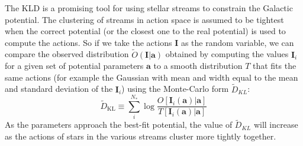 \documentclass[useAMS,usenatbib,a4paper,referee]{mn2e}
\newcommand{\sub}[2]{\ensuremath{#1_{\mathrm{#2}}}}
\begin{document}
The KLD is a promising tool for using stellar streams to constrain the Galactic potential. The clustering of streams in action space is assumed to be tightest when the correct potential (or the closest one to the real potential) is used to compute the actions. So if we take the actions $\mathbf{I}$ as the random variable, we can compare the observed distribution $\tilde{O}(\mathbf{I}|\mathbf{a})$ obtained by computing the values $\mathbf{I}_i$ for a given set of potential parameters $\mathbf{a}$ to a smooth distribution $T$ that fits the same actions (for example the Gaussian with mean and width equal to the mean and standard deviation of the $\mathbf{I}_i$) using the Monte-Carlo form $\tilde{D}_{KL}$:
\begin{equation}
\sub{\tilde{D}}{KL} \equiv \sum_i^{N_*} \log \frac{O[\mathbf{I}_i(\mathbf{a})|\mathbf{a}]}{T[\mathbf{I}_i(\mathbf{a})|\mathbf{a}]}
\end{equation}
As the parameters approach the best-fit potential, the value of $\tilde{D}_{KL}$ will increase as the actions of stars in the various streams cluster more tightly together. 
\end{document}
